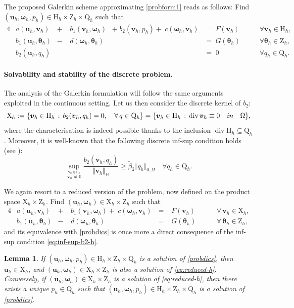 \documentclass[reqno,a4paper]{article}
\numberwithin{equation}{section}
\newcommand\bu{\boldsymbol{u}}
\newcommand\bv{\boldsymbol{v}}
\renewcommand\O{\Omega}
\renewcommand\H{\mathrm{H}}
\newcommand\Q{\mathrm{Q}}
\newcommand\Z{\mathrm{Z}}
\newcommand\X{\mathrm{X}}
\newcommand\vdiv{\mathop{\mathrm{div}}\nolimits}
\newcommand\bomega{\boldsymbol{\omega}}
\newcommand\btheta{\boldsymbol{\theta}}
\newtheorem{lemma}{Lemma}[section]
\begin{document}
The proposed Galerkin scheme approximating \eqref{probform1} reads as follows:
 Find $(\bu_h,\bomega_h,p_h)\in\H_h\times\Z_h\times\Q_h$ such that 
\begin{alignat}{4}
&a(\bu_h,\bv_h)&+&\;b_{1}(\bv_h,\bomega_h)&+\;b_2(\bv_h,p_h)+\;c(\bomega_h,
\bv_h)&=\;
F(\bv_h)&\qquad\forall\bv_h\in\H_h,\nonumber\\
&b_{1}(\bu_h,\btheta_h)&-&\;d(\bomega_h,
\btheta_h)&&=\;G(\btheta_h)&\qquad\forall\btheta_h\in\Z_h,\label{probdics}\\
&b_2(\bu_h,q_h)&&&&=\;0&\qquad\forall q_h\in\Q_h.\nonumber
\end{alignat}

\paragraph{Solvability and stability of the discrete problem.}
The analysis of the Galerkin formulation will follow 
the same arguments exploited in the continuous setting.
Let us then consider the discrete kernel of $b_2$:
\begin{equation}\label{kernel-h}
 \X_h := \{ \bv_h \in \H_h\,:\, b_2(\bv_h,q_h)=0,\quad \forall \, q\in \Q_h\}=
 \{ \bv_h \in \H_h\,:\, \vdiv \bv_h\equiv 0\quad {\rm in}\quad \Omega\},
\end{equation}
where the characterisation is indeed possible 
thanks to the inclusion  $\vdiv \H_h\subseteq \Q_h$. Moreover,
it is well-known that the following discrete inf-sup condition holds
(see \cite{G2014}):
\begin{equation}\label{eq:inf-sup-b2-h}
\sup_{\stackrel{\scriptstyle\bv_h\in\H_h}{\bv_h\ne0}}\frac{ b_{2}(\bv_h,q_h)}{\Vert\bv_h\Vert_{\H}}\ge
\tilde\beta_2\Vert q_h\Vert_{0,\O}\quad\forall q_h\in\Q_h.
\end{equation}

We again resort to a reduced version of the problem, now defined on the product space 
$\X_h\times \Z_h$. Find $(\bu_h,\bomega_h)\in \X_h\times \Z_h$ such that 
\begin{alignat}{4}
&a(\bu_h,\bv_h)      &+&\;b_{1}(\bv_h,\bomega_h)+\;c(\bomega_h,\bv_h)\,&=\;&
F(\bv_h)\,&\qquad\forall\,\bv_h\in\X_h,\nonumber\\
&b_{1}(\bu_h,\btheta_h)&-&\;d(\bomega_h,\btheta_h)\,&=\;&G(\btheta_h)\,
&\qquad\forall\,\btheta_h\in\Z_h\label{eq:reduced-h},
\end{alignat}
and its equivalence with \eqref{probdics} is once more a direct consequence of
the inf-sup condition \eqref{eq:inf-sup-b2-h}.
\begin{lemma}\label{lemma:equivalence-h}
If $(\bu_h,\bomega_h,p_h)\in \H_h\times\Z_h\times\Q_h$ is a solution of \eqref{probdics}, then $\bu_h\in \X_h$, and $(\bu_h,\bomega_h)\in \X_h\times\Z_h$
is also a solution of \eqref{eq:reduced-h}. Conversely, if $(\bu_h,\bomega_h)\in \X_h\times\Z_h$ is a solution of \eqref{eq:reduced-h},
then there exists a unique $p_h\in\Q_h$ such that $(\bu_h,\bomega_h,p_h)\in \H_h\times\Z_h\times\Q_h$ is a solution of \eqref{probdics}.
\end{lemma}
\end{document}
